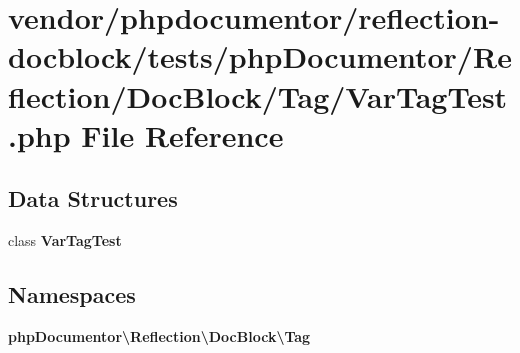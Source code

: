 \section{vendor/phpdocumentor/reflection-\/docblock/tests/php\+Documentor/\+Reflection/\+Doc\+Block/\+Tag/\+Var\+Tag\+Test.php File Reference}
\label{_var_tag_test_8php}
\subsection*{Data Structures}
\begin{DoxyCompactItemize}
\item 
class {\bf Var\+Tag\+Test}
\end{DoxyCompactItemize}
\subsection*{Namespaces}
\begin{DoxyCompactItemize}
\item 
 {\bf php\+Documentor\textbackslash{}\+Reflection\textbackslash{}\+Doc\+Block\textbackslash{}\+Tag}
\end{DoxyCompactItemize}
